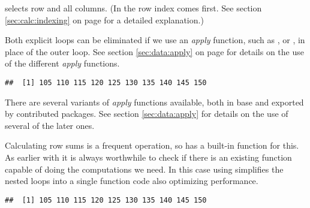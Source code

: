 \documentclass[krantz2]{krantz}\usepackage{knitr}%
\begin{document}
\begin{explainbox}
 selects row  and all columns. (In \Rlang the row index comes first. See section \ref{sec:calc:indexing} on page \pageref{sec:calc:indexing} for a detailed explanation.)

Both explicit loops can be eliminated if we use an \emph{apply} function, such as ,  or , in place of the outer  loop. See section \ref{sec:data:apply} on page \pageref{sec:data:apply} for details on the use of the different \emph{apply} functions.

\begin{knitrout}\footnotesize
{}\color{fgcolor}\begin{kframe}
\begin{alltt}
 \hlkwb{<-}   \hlstd{=}  
\end{alltt}
\begin{verbatim}
##  [1] 105 110 115 120 125 130 135 140 145 150
\end{verbatim}
\end{kframe}
\end{knitrout}
There are several variants of \emph{apply} functions available, both in base \Rlang and exported by contributed packages. See section \ref{sec:data:apply} for details on the use of several of the later ones.

Calculating row sums is a frequent operation, so \Rlang has a built-in function for this. As earlier with  it is always worthwhile to check if there is an existing \Rlang function capable of doing the computations we need. In this case using  simplifies the nested loops into a single function code also optimizing performance.

\begin{knitrout}\footnotesize
{}\color{fgcolor}\begin{kframe}
\begin{alltt}
\end{alltt}
\begin{verbatim}
##  [1] 105 110 115 120 125 130 135 140 145 150
\end{verbatim}
\end{kframe}
\end{knitrout}

\end{explainbox}
\end{document}

